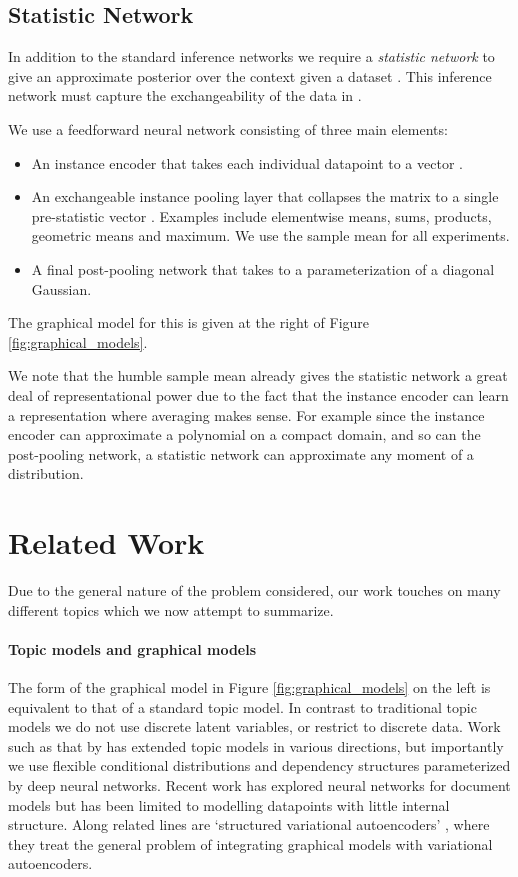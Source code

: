 \documentclass{article} \usepackage{iclr2017_conference,times}
\begin{document}
\subsection{Statistic Network}
\label{statistic_network}
In addition to the standard inference networks we require a \emph{statistic network}   to give an approximate posterior over the context  given a dataset  . This inference network must capture the exchangeability of the data in .

We use a feedforward neural network consisting of three main elements:
\begin{itemize}
\item An instance encoder  that takes each individual datapoint  to a vector .
\item An exchangeable instance pooling layer that collapses the matrix  to a single pre-statistic vector . Examples include elementwise means, sums, products, geometric means and maximum. We use the sample mean for all experiments.
\item A final post-pooling network that takes  to a parameterization of a diagonal Gaussian.
\end{itemize}
The graphical model for this is given at the right of Figure \ref{fig:graphical_models}.

We note that the humble sample mean already gives the statistic network a great deal of representational power due to the fact that the instance encoder can learn a representation where averaging makes sense. For example since the instance encoder can approximate a polynomial on a compact domain, and so can the post-pooling network, a statistic network can approximate any moment of a distribution.
\vspace{-1em}
\section{Related Work}
Due to the general nature of the problem considered, our work touches on many different topics which we now attempt to summarize.
\vspace{-0.5em}
\paragraph{Topic models and graphical models} The form of the graphical model in Figure \ref{fig:graphical_models} on the left is equivalent to that of a standard topic model. In contrast to traditional topic models we do not use discrete latent variables, or restrict to discrete data. Work such as that by \cite{topic_model} has extended topic models in various directions, but importantly we use flexible conditional distributions and dependency structures parameterized by deep neural networks. Recent work has explored neural networks for document models \citep[see e.g.][]{neural_variational_text} but has been limited to modelling datapoints with little internal structure. Along related lines are `structured variational autoencoders' \citep[see][]{structured_vae}, where they treat the general problem of integrating graphical models with variational autoencoders.
\end{document}
